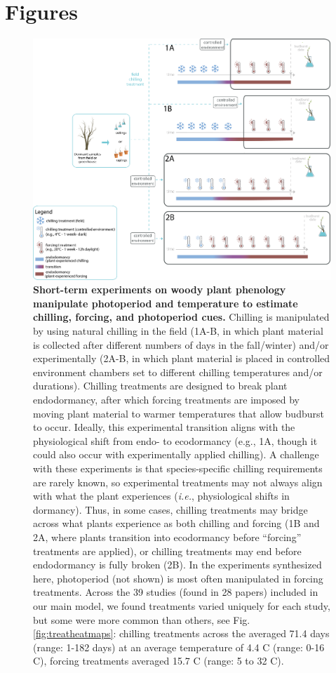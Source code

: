 \documentclass{article}
\begin{document}
\clearpage
\section* {Figures}
\begin{figure}[h!]
\centering
\noindent 
\includegraphics[width=1\textwidth]{figures/concept/Fig_bbconcept_dormant_V8.png}

\caption{\textbf{Short-term experiments on woody plant phenology manipulate photoperiod and temperature to estimate chilling, forcing, and photoperiod cues.} Chilling is manipulated by using natural chilling in the field (1A-B, in which plant material is collected after different numbers of days in the fall/winter) and/or experimentally (2A-B, in which plant material is placed in controlled environment chambers set to different chilling temperatures and/or durations). Chilling treatments are designed to break plant endodormancy, after which forcing treatments are imposed by moving plant material to warmer temperatures that allow budburst to occur. Ideally, this experimental transition aligns with the physiological shift from endo- to ecodormancy (e.g., 1A, though it could also occur with experimentally applied chilling). A challenge with these experiments is that species-specific chilling requirements are rarely known, so experimental treatments may not always align with what the plant experiences (\emph{i.e.}, physiological shifts in dormancy). Thus, in some cases, chilling treatments may bridge across what plants experience as both chilling and forcing (1B and 2A, where plants transition into ecodormancy before ``forcing'' treatments are applied), or chilling treatments may end before endodormancy is fully broken (2B). In the experiments synthesized here, photoperiod (not shown) is most often manipulated in forcing treatments. Across the 39 studies (found in 28 papers) included in our main model, we found treatments varied uniquely for each study, but some were more common than others, see Fig. \ref{fig:treatheatmaps}: chilling treatments across the averaged 71.4 days (range: 1-182 days) at an average temperature of 4.4 \degree C (range: 0-16 \degree C), forcing treatments averaged 15.7 \degree C (range: 5 to 32 \degree C).}
\label{fig:concept} 
\end{figure}
\end{document}
